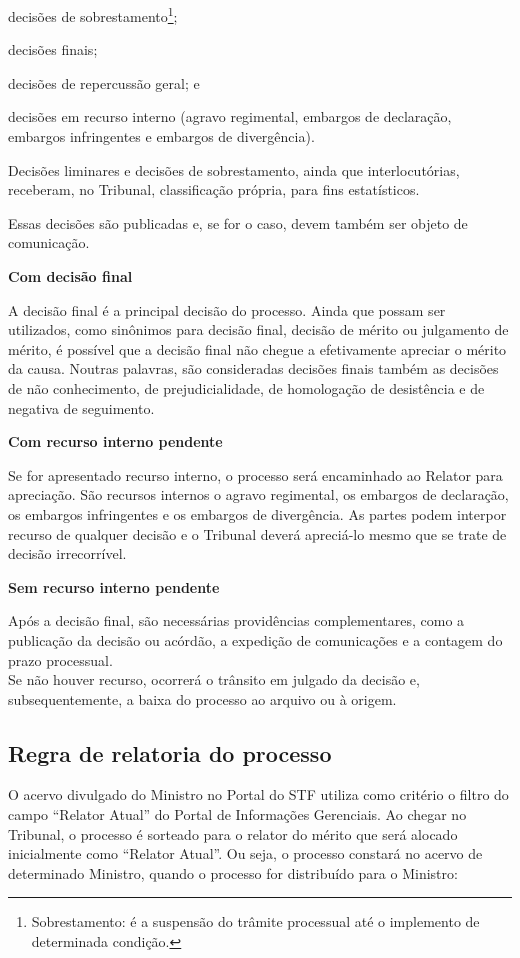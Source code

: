 \documentclass[
]{book}
\theoremstyle{definition}
\theoremstyle{definition}
\theoremstyle{definition}
\theoremstyle{definition}
\theoremstyle{remark}
\begin{document}
decisões de sobrestamento\footnote{Sobrestamento: é a suspensão do trâmite processual até o implemento de determinada condição.};

decisões finais;

decisões de repercussão geral; e

decisões em recurso interno (agravo regimental, embargos de declaração, embargos infringentes e embargos de divergência).

Decisões liminares e decisões de sobrestamento, ainda que interlocutórias, receberam, no Tribunal, classificação própria, para fins estatísticos.

Essas decisões são publicadas e, se for o caso, devem também ser objeto de comunicação.

\textbf{Com decisão final}

A decisão final é a principal decisão do processo. Ainda que possam ser utilizados, como sinônimos para decisão final, decisão de mérito ou julgamento de mérito, é possível que a decisão final não chegue a efetivamente apreciar o mérito da causa. Noutras palavras, são consideradas decisões finais também as decisões de não conhecimento, de prejudicialidade, de homologação de desistência e de negativa de seguimento.

\textbf{Com recurso interno pendente}

Se for apresentado recurso interno, o processo será encaminhado ao Relator para apreciação.
São recursos internos o agravo regimental, os embargos de declaração, os embargos infringentes e os embargos de divergência.
As partes podem interpor recurso de qualquer decisão e o Tribunal deverá apreciá-lo mesmo que se trate de decisão irrecorrível.

\textbf{Sem recurso interno pendente}

Após a decisão final, são necessárias providências complementares, como a publicação da decisão ou acórdão, a expedição de comunicações e a contagem do prazo processual.\\
Se não houver recurso, ocorrerá o trânsito em julgado da decisão e, subsequentemente, a baixa do processo ao arquivo ou à origem.

\hypertarget{regra-de-relatoria-do-processo}{%
\subsection{Regra de relatoria do processo}\label{regra-de-relatoria-do-processo}}

O acervo divulgado do Ministro no Portal do STF utiliza como critério o filtro do campo ``Relator Atual'' do Portal de Informações Gerenciais. Ao chegar no Tribunal, o processo é sorteado para o relator do mérito que será alocado inicialmente como ``Relator Atual''.
Ou seja, o processo constará no acervo de determinado Ministro, quando o processo for distribuído para o Ministro:
\end{document}
